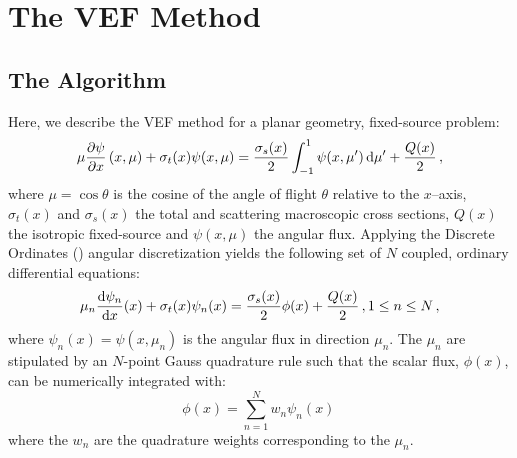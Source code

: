 
\newcommand{\rell}{^\ell} %
\newcommand{\relll}{^{\ell+1}} %
\newcommand{\rellh}{^{\ell+1/2}} %

\newcommand{\paren}[1]{\left(#1\right)} 

\section{The VEF Method}
\subsection{The Algorithm}
Here, we describe the VEF method for a planar geometry, fixed-source problem:
	\begin{equation} 
		\mu \pderiv{\psi}{x} \paren{x, \mu} + \sigma_t(x) \psi(x,\mu) = 
			\frac{\sigma_s(x)}{2} \int_{-1}^1 \psi(x,\mu') \ud \mu' + \frac{Q(x)}{2} \,,
	\end{equation}
where $\mu = \cos\theta$ is the cosine of the angle of flight $\theta$ relative to the $x$--axis, $\sigma_t(x)$ and $\sigma_s(x)$ the total and scattering macroscopic cross sections, $Q(x)$ the isotropic fixed-source and $\psi(x, \mu)$ the angular flux. Applying the Discrete Ordinates (\SN) angular discretization yields the following set of $N$ coupled, ordinary differential equations: 
	\begin{equation} \label{eq:sn}
		\mu_n \frac{\mathop{}\!\mathrm{d} \psi_n}{\mathop{}\!\mathrm{d} x}(x) + \sigma_t(x) \psi_n(x) = 
		\frac{\sigma_s(x)}{2} \phi(x) + \frac{Q(x)}{2} \,, 1 \leq n \leq N \,,
	\end{equation}
where $\psi_n(x) = \psi(x, \mu_n)$ is the angular flux in direction $\mu_n$. The $\mu_n$ are stipulated by an $N$-point Gauss quadrature rule such that the scalar flux, $\phi(x)$, can be numerically integrated with: 
	\begin{equation} \label{eq:phiquad}
		\phi(x) = \sum_{n=1}^N w_n \psi_n(x) \,
	\end{equation}
where the $w_n$ are the quadrature weights corresponding to the $\mu_n$. 

